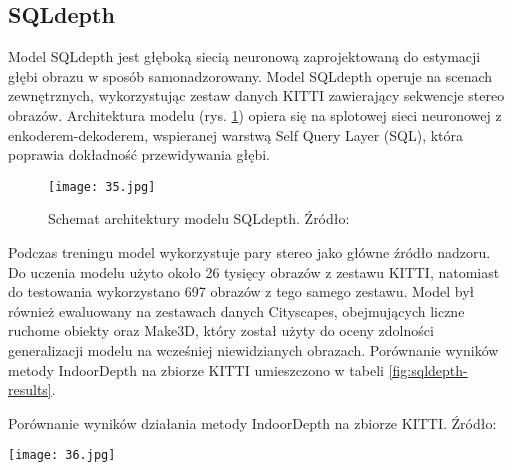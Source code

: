 \subsection{SQLdepth}
Model SQLdepth \cite{wang2023sqldepth} jest głęboką siecią neuronową zaprojektowaną do estymacji głębi obrazu w sposób samonadzorowany. Model SQLdepth operuje na scenach zewnętrznych, wykorzystując zestaw danych KITTI zawierający sekwencje stereo obrazów. Architektura modelu (rys. \ref{fig:sqldepth-architecture}) opiera się na splotowej sieci neuronowej z enkoderem-dekoderem, wspieranej warstwą Self Query Layer (SQL), która poprawia dokładność przewidywania głębi.
\begin{figure}[H]
    \centering
    \texttt{[image: 35.jpg]}
    \caption{Schemat architektury modelu SQLdepth. Źródło: \cite{wang2023sqldepth}}
    \label{fig:sqldepth-architecture}
\end{figure}
Podczas treningu model wykorzystuje pary stereo jako główne źródło nadzoru. Do uczenia modelu użyto około 26 tysięcy obrazów z zestawu KITTI, natomiast do testowania wykorzystano 697 obrazów z tego samego zestawu. Model był również ewaluowany na zestawach danych Cityscapes, obejmujących liczne ruchome obiekty oraz Make3D, który został użyty do oceny zdolności generalizacji modelu na wcześniej niewidzianych obrazach. Porównanie wyników metody IndoorDepth na zbiorze KITTI umieszczono w tabeli \ref{fig:sqldepth-results}.
\begin{table}[H]
    \centering
    \caption{Porównanie wyników działania metody IndoorDepth na zbiorze KITTI. Źródło: \cite{wang2023sqldepth}}
    \texttt{[image: 36.jpg]}
    \label{fig:sqldepth-results}
\end{table}


